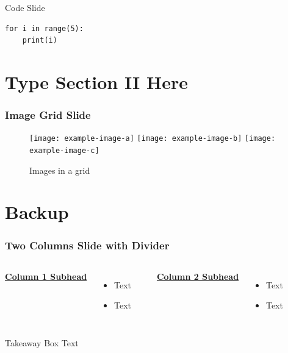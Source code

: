 \documentclass[11pt,aspectratio=169] {beamer}
\begin{document}
\begin{frame}[fragile]{Code Slide}
\begin{verbatim}
for i in range(5):
    print(i)
\end{verbatim}
\end{frame}
\section{Type Section II Here}

\begin{frame}
\frametitle{Image Grid Slide}
\begin{figure}
\texttt{[image: example-image-a]}
\texttt{[image: example-image-b]}
\texttt{[image: example-image-c]}
\caption{Images in a grid}
\end{figure}
\end{frame}

\bgroup
{}
\begin{frame}[plain]{}
\end{frame}
\egroup

\section{Backup}
\begin{frame}[t]
\frametitle{Two Columns Slide with Divider}
\begin{columns}[T]
\underline{\textbf{Column 1 Subhead}}
\begin{itemize}
\item Text
\item Text
\end{itemize}

\centering
\rule{0.5pt}{4cm} %

\underline{\textbf{Column 2 Subhead}}
\begin{itemize}
\item Text
\item Text
\end{itemize}
\end{columns}
\vfill
\begin{block}{Takeaway Box}
Text
\end{block}
\vfill
\end{frame}
\end{document}

